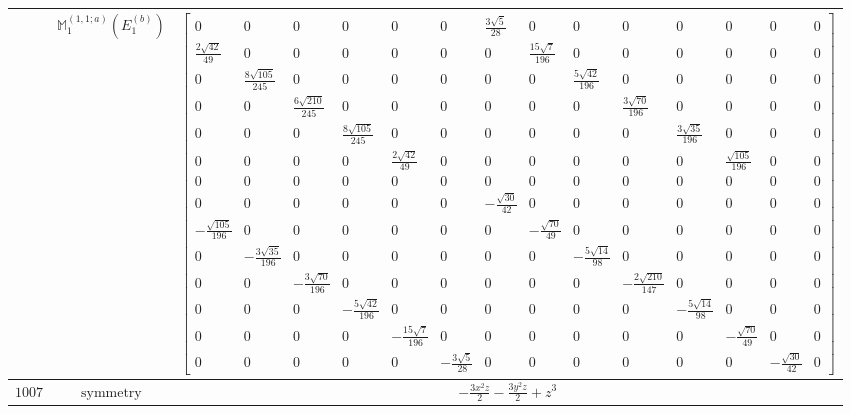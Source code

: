 \documentclass[fleqn,8pt,landscape]{jsarticle}
\begin{document}
\begin{longtable}{ccc}
$  $ & $ \mathbb{M}_{1}^{(1,1;a)}(E_{1}^{(b)}) $ & $ \begin{bmatrix} 0 & 0 & 0 & 0 & 0 & 0 & \frac{3 \sqrt{5}}{28} & 0 & 0 & 0 & 0 & 0 & 0 & 0 \\ \frac{2 \sqrt{42}}{49} & 0 & 0 & 0 & 0 & 0 & 0 & \frac{15 \sqrt{7}}{196} & 0 & 0 & 0 & 0 & 0 & 0 \\ 0 & \frac{8 \sqrt{105}}{245} & 0 & 0 & 0 & 0 & 0 & 0 & \frac{5 \sqrt{42}}{196} & 0 & 0 & 0 & 0 & 0 \\ 0 & 0 & \frac{6 \sqrt{210}}{245} & 0 & 0 & 0 & 0 & 0 & 0 & \frac{3 \sqrt{70}}{196} & 0 & 0 & 0 & 0 \\ 0 & 0 & 0 & \frac{8 \sqrt{105}}{245} & 0 & 0 & 0 & 0 & 0 & 0 & \frac{3 \sqrt{35}}{196} & 0 & 0 & 0 \\ 0 & 0 & 0 & 0 & \frac{2 \sqrt{42}}{49} & 0 & 0 & 0 & 0 & 0 & 0 & \frac{\sqrt{105}}{196} & 0 & 0 \\ 0 & 0 & 0 & 0 & 0 & 0 & 0 & 0 & 0 & 0 & 0 & 0 & 0 & 0 \\ 0 & 0 & 0 & 0 & 0 & 0 & - \frac{\sqrt{30}}{42} & 0 & 0 & 0 & 0 & 0 & 0 & 0 \\ - \frac{\sqrt{105}}{196} & 0 & 0 & 0 & 0 & 0 & 0 & - \frac{\sqrt{70}}{49} & 0 & 0 & 0 & 0 & 0 & 0 \\ 0 & - \frac{3 \sqrt{35}}{196} & 0 & 0 & 0 & 0 & 0 & 0 & - \frac{5 \sqrt{14}}{98} & 0 & 0 & 0 & 0 & 0 \\ 0 & 0 & - \frac{3 \sqrt{70}}{196} & 0 & 0 & 0 & 0 & 0 & 0 & - \frac{2 \sqrt{210}}{147} & 0 & 0 & 0 & 0 \\ 0 & 0 & 0 & - \frac{5 \sqrt{42}}{196} & 0 & 0 & 0 & 0 & 0 & 0 & - \frac{5 \sqrt{14}}{98} & 0 & 0 & 0 \\ 0 & 0 & 0 & 0 & - \frac{15 \sqrt{7}}{196} & 0 & 0 & 0 & 0 & 0 & 0 & - \frac{\sqrt{70}}{49} & 0 & 0 \\ 0 & 0 & 0 & 0 & 0 & - \frac{3 \sqrt{5}}{28} & 0 & 0 & 0 & 0 & 0 & 0 & - \frac{\sqrt{30}}{42} & 0 \end{bmatrix} $ \\ \hline
$ 1007 $ & $ \text{symmetry} $ & $ - \frac{3 x^{2} z}{2} - \frac{3 y^{2} z}{2} + z^{3} $ \\

\end{longtable}
\end{document}

